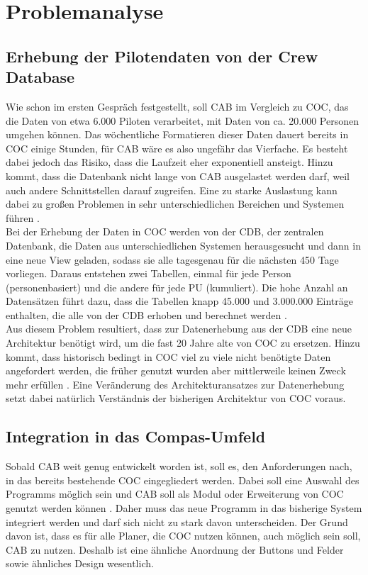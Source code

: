 \documentclass [12pt, a4paper, oneside, titlepage, ngerman]{article}
\begin{document}
\newpage

\section{Problemanalyse} \label{unterschiede}
\subsection{Erhebung der Pilotendaten von der Crew Database}
Wie schon im ersten Gespräch festgestellt, soll \ac{CAB} im Vergleich zu \ac{COC}, das die Daten von etwa 6.000 Piloten verarbeitet, mit Daten von ca. 20.000 Personen umgehen können. Das wöchentliche Formatieren dieser Daten dauert bereits in \ac{COC} einige Stunden, für \ac{CAB} wäre es also ungefähr das Vierfache. Es besteht dabei jedoch das Risiko, dass die Laufzeit eher exponentiell ansteigt. Hinzu kommt, dass die Datenbank nicht lange von \ac{CAB} ausgelastet werden darf, weil auch andere Schnittstellen darauf zugreifen. Eine zu starke Auslastung kann dabei zu großen Problemen in sehr unterschiedlichen Bereichen und Systemen führen \cite[vgl.][]{Gespraech1}. \\
Bei der Erhebung der Daten in \ac{COC} werden von der \ac{CDB}, der zentralen Datenbank, die Daten aus unterschiedlichen Systemen herausgesucht und dann in eine neue View geladen, sodass sie alle tagesgenau für die nächsten 450 Tage vorliegen. Daraus entstehen zwei Tabellen, einmal für jede Person (personenbasiert) und die andere für jede PU (kumuliert). Die hohe Anzahl an Datensätzen führt dazu, dass die Tabellen knapp 45.000 und 3.000.000 Einträge enthalten, die alle von der \ac{CDB} erhoben und berechnet werden \cite[vgl.][]{Gespraech3}.  \\

\noindent Aus diesem Problem resultiert, dass zur Datenerhebung aus der \ac{CDB} eine neue Architektur benötigt wird, um die fast 20 Jahre alte von \ac{COC} zu ersetzen. Hinzu kommt, dass historisch bedingt in \ac{COC} viel zu viele nicht benötigte Daten angefordert werden, die früher genutzt wurden aber mittlerweile keinen Zweck mehr erfüllen \cite[vgl.][]{Gespraech3}. Eine Veränderung des Architekturansatzes zur Datenerhebung setzt dabei natürlich Verständnis der bisherigen Architektur von \ac{COC} voraus.

\subsection{Integration in das Compas-Umfeld}
Sobald \ac{CAB} weit genug entwickelt worden ist, soll es, den Anforderungen nach, in das bereits bestehende \ac{COC} eingegliedert werden. Dabei soll eine Auswahl des Programms möglich sein und \ac{CAB} soll als Modul oder Erweiterung von \ac{COC} genutzt werden können \cite[vgl.][S.6]{anwenderkonzept}. Daher muss das neue Programm in das bisherige System integriert werden und darf sich nicht zu stark davon unterscheiden. Der Grund davon ist, dass es für alle Planer, die \ac{COC} nutzen können, auch möglich sein soll, \ac{CAB} zu nutzen. Deshalb ist eine ähnliche Anordnung der Buttons und Felder sowie ähnliches Design wesentlich. \\
\end{document}
